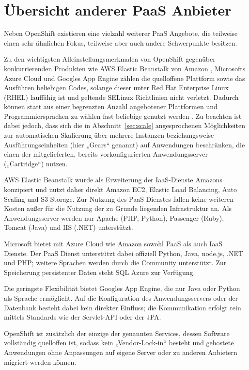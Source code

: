 \documentclass[10pt,a4paper,compsoc]{IEEEtran}
\begin{document}
\section{Übersicht anderer PaaS Anbieter}
\label{sec:related}
Neben OpenShift existieren eine vielzahl weiterer PaaS Angebote, die teilweise einen sehr ähnlichen Fokus, teilweise aber auch andere Schwerpunkte besitzen.

Zu den wichtigsten Alleinstellungsmerkmalen von OpenShift gegenüber konkurrierenden Produkten wie AWS Elastic Beanstalk von Amazon \cite{aws}, Microsofts Azure Cloud \cite{azure} und Googles App Engine \cite{app_engine} zählen die quelloffene Plattform sowie das Ausführen beliebigen Codes, solange dieser unter Red Hat Enterprise Linux (RHEL) lauffähig ist und geltende SELinux Richtlinien nicht verletzt. Dadurch können statt aus einer begrenzten Anzahl angebotener Plattformen und Programmiersprachen zu wählen fast beliebige genutzt werden \cite{os_paas}. Zu beachten ist dabei jedoch, dass sich die in Abschnitt~\ref{sec:scale} angesprochenen Möglichkeiten zur automatischen Skalierung über mehrere Instanzen beziehungsweise Ausführungseinheiten (hier „Gears“ genannt) auf Anwendungen beschränken, die einen der mitgelieferten, bereits vorkonfigurierten Anwendungsserver („Cartridge“) nutzen.

AWS Elastic Beanstalk wurde als Erweiterung der IaaS-Dienste Amazons konzipiert und nutzt daher direkt Amazon EC2, Elastic Load Balancing, Auto Scaling und S3 Storage. Zur Nutzung des PaaS Dienstes fallen keine weiteren Kosten außer für die Nutzung der zu Grunde liegenden Infrastruktur an. Als Anwendungsserver werden nur Apache (PHP, Python), Passenger (Ruby), Tomcat (Java) und IIS (.NET) unterstützt.

Microsoft bietet mit Azure Cloud wie Amazon sowohl PaaS als auch IaaS Dienste. Der PaaS Dienst unterstützt dabei offiziell Python, Java, node.js, .NET und PHP; weitere Sprachen werden durch die Community unterstützt. Zur Speicherung persistenter Daten steht SQL Azure zur Verfügung.

Die geringste Flexibilität bietet Googles App Engine, die nur Java oder Python als Sprache ermöglicht. Auf die Konfiguration des Anwendungsservers oder der Datenbank besteht dabei kein direkter Einfluss; die Kommunikation erfolgt rein mittels Standards wie der Servlet-API oder der JPA.

OpenShift ist zusätzlich der einzige der genannten Services, dessen Software vollständig quelloffen ist, sodass kein „Vendor-Lock-in“ besteht und gehostete Anwendungen ohne Anpassungen auf eigene Server oder zu anderen Anbietern migriert werden können.
\end{document}
